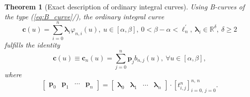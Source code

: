 \documentclass[b5paper, twosided]{book}
\newtheorem{theorem}{Theorem}[chapter]
\DeclareRobustCommand{\mref}[1]{\ref{#1}{\relsize{-1}/\pageref{#1}}}
\begin{document}
\begin{theorem}[Exact description of ordinary integral curves]\label{thm:integral_curves}
	Using B-curves of the type (\mref{eq:B_curve}), the ordinary integral curve
	\begin{equation}
	\mathbf{c}\left(u\right) = \sum_{i=0}^{n} \boldsymbol{\lambda}_i \varphi_{n,i}\left(u\right), ~u\in\left[\alpha,\beta\right], ~0<\beta-\alpha <\ell^{\prime}_{n},~\boldsymbol{\lambda}_i \in \mathbb{R}^{\delta},~\delta \geq 2
	\label{eq:ordinary_integral_curve}
	\end{equation}
	fulfills the identity
	\[
	\mathbf{c}\left(u\right)\equiv \mathbf{c}_n\left(u\right) = \sum_{j=0}^n \mathbf{p}_j b_{n,j}\left(u\right),~\forall u \in \left[\alpha,\beta\right],
	\]
	where
	\begin{equation}
	\label{eq:cpbed_ordinary_curves}
	\left[
	\begin{array}{cccc}
	\mathbf{p}_0 & \mathbf{p}_1 & \cdots & \mathbf{p}_n
	\end{array}
	\right]
	=
	\left[
	\begin{array}{cccc}
	\boldsymbol{\lambda}_0 & \boldsymbol{\lambda}_1 & \cdots & \boldsymbol{\lambda}_n
	\end{array}
	\right]
	\cdot
	\left[
	t_{i,j}^n
	\right]_{i=0,\,j=0}^{n,\,n}.
	\end{equation}
\end{theorem}
\end{document}
